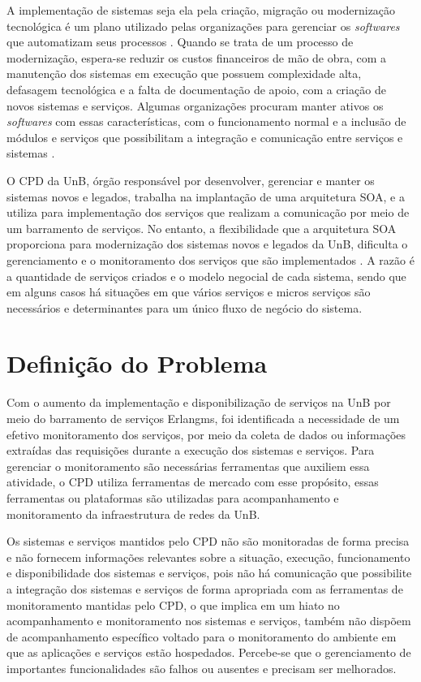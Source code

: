 \label{Introducao}

A implementação de sistemas seja ela pela criação, migração ou modernização tecnológica é um plano utilizado pelas organizações para gerenciar os \textit{softwares} que automatizam seus processos \cite{Agilar}. Quando se trata de um processo de modernização, espera-se reduzir os custos financeiros de mão de obra, com a manutenção dos sistemas em execução que possuem complexidade alta, defasagem tecnológica e a falta de documentação de apoio, com a criação de novos sistemas e serviços. Algumas organizações procuram manter ativos os \textit{softwares} com essas características, com o funcionamento normal e a inclusão de módulos e serviços que possibilitam a integração e comunicação entre serviços e sistemas \cite{Agilar}.

O \acrshort{CPD} da \acrshort{UnB}, órgão responsável por desenvolver, gerenciar e manter os sistemas novos e legados, trabalha na implantação de uma arquitetura \acrshort{SOA}, e a utiliza para implementação dos serviços que realizam a comunicação por meio de um barramento de serviços. No entanto, a flexibilidade que a arquitetura \acrshort{SOA} proporciona para modernização dos sistemas novos e legados da \acrshort{UnB}, dificulta o gerenciamento e o monitoramento dos serviços que são implementados \cite{Agilar}. A razão é a quantidade de serviços criados e o modelo negocial de cada sistema, sendo que em alguns casos há situações em que vários serviços e micros serviços são necessários e determinantes para um único fluxo de negócio do sistema.


\section{Definição do Problema}
Com o aumento da implementação e disponibilização de serviços na \acrshort{UnB} por meio do barramento de serviços Erlangms\cite{Agilar}, foi identificada a necessidade de um efetivo monitoramento dos serviços, por meio da coleta de dados ou informações extraídas das requisições durante a execução dos sistemas e serviços. Para gerenciar o monitoramento são necessárias ferramentas que auxiliem essa atividade, o \acrshort{CPD} utiliza ferramentas de mercado com esse propósito, essas ferramentas ou plataformas são utilizadas para acompanhamento e monitoramento da infraestrutura de redes da \acrshort{UnB}.

Os sistemas e serviços mantidos pelo \acrshort{CPD} não são monitoradas de forma precisa e não fornecem informações relevantes sobre a situação, execução, funcionamento e disponibilidade dos sistemas e serviços, pois não há comunicação que possibilite a integração dos sistemas e serviços de forma apropriada com as ferramentas de monitoramento mantidas pelo \acrshort{CPD}, o que implica em um hiato no acompanhamento e monitoramento nos sistemas e serviços, também não dispõem de acompanhamento específico voltado para o monitoramento do ambiente em que as aplicações e serviços estão hospedados. Percebe-se que o gerenciamento de importantes funcionalidades são falhos ou ausentes e precisam ser melhorados.

